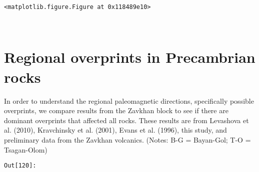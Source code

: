 \documentclass[11pt]{article}
\begin{document}
    
    \begin{verbatim}
<matplotlib.figure.Figure at 0x118489e10>
    \end{verbatim}

    
    \begin{center}
    \end{center}
    { \hspace*{\fill} \\}
    
    \section{Regional overprints in Precambrian
rocks}\label{regional-overprints-in-precambrian-rocks}

    In order to understand the regional paleomagnetic directions,
specifically possible overprints, we compare results from the Zavkhan
block to see if there are dominant overprints that affected all rocks.
These results are from Levashova et al. (2010), Kravchinsky et al.
(2001), Evans et al. (1996), this study, and preliminary data from the
Zavkhan volcanics. (Notes: B-G = Bayan-Gol; T-O = Tsagan-Olom)

\texttt{\color{outcolor}Out[{\color{outcolor}120}]:}
    
\end{document}
